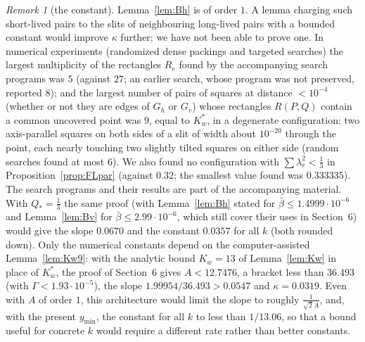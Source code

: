 \documentclass[11pt]{amsart}
\theoremstyle{definition}
\theoremstyle{remark}
\newtheorem{remark}[theorem]{Remark}
\begin{document}
\begin{remark}[the constant]
Lemma~\ref{lem:Bh} is of order $1$. A lemma charging such short-lived pairs to the slits of neighbouring long-lived pairs with a
bounded constant would improve $\kappa$ further; we have not been able to prove one. In numerical experiments (randomized dense packings and targeted searches) the largest multiplicity of the rectangles
$R_e$ found by the accompanying search programs was $5$ (against $27$; an earlier search, whose program was not preserved,
reported $8$); and the largest number of pairs of squares at distance $<10^{-4}$ (whether or not they
are edges of $G_h$ or $G_v$) whose rectangles $R(P,Q)$ contain a common uncovered point was $9$, equal to $K_w^*$, in a degenerate
configuration: two axis-parallel squares on both sides of a slit of width about $10^{-20}$ through the point, each nearly touching
two slightly tilted squares on either side (random searches found at most $6$). We also found no configuration with $\sum\lambda_r^2<\frac13$ in Proposition~\ref{prop:FLpar}
(against $0.32$; the smallest value found was $0.333335$). The search programs and their results are part of the accompanying material. With $Q_*=\frac13$ the same proof (with Lemma~\ref{lem:Bh} stated for $\bar\beta\le1.4999\cdot10^{-6}$ and Lemma~\ref{lem:Bv} for
$\bar\beta\le2.99\cdot10^{-6}$, which still cover their uses in Section~6) would give
the slope $0.0670$ and the constant $0.0357$ for all $k$ (both rounded down).
Only the numerical constants depend on the computer-assisted Lemma~\ref{lem:Kw9}: with the analytic bound $K_w=13$ of
Lemma~\ref{lem:Kw} in place of $K_w^*$, the proof of Section~6 gives $A<12.7476$, a bracket less than $36.493$ (with
$\Gamma<1.93\cdot10^{-5}$), the slope $1.99954/36.493>0.0547$ and $\kappa=0.0319$. Even with $A$ of order $1$, this
architecture would limit the slope to roughly $\frac1{\sqrt2A}$, and, with the present $y_{\min}$, the constant for all $k$ to less than
$1/13.06$, so that a bound useful for concrete $k$ would require a different rate rather than better constants.
\end{remark}
\end{document}
